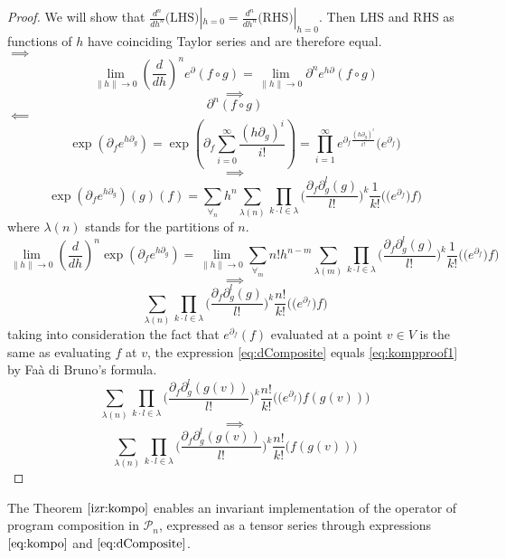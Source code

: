 \documentclass{article}
\newcommand{\dP}{\mathcal{P}}
\newcommand{\D}{\partial}
\begin{document}
\begin{proof}
  We will show that $\frac{d^n}{dh^n}\text{(LHS)}|_{h=0}=\frac{d^n}{dh^n}\text{(RHS)}|_{h=0}$. Then $\text{LHS}$ and $\text{RHS}$ as functions
  of $h$ have coinciding Taylor series and are therefore equal.\\
 $\implies$
 $$\lim\limits_{\lVert h\rVert\to 0}(\frac{d}{dh})^ne^\D(f\circ g)=\lim\limits_{\lVert h\rVert\to 0}\D^ne^{h\D}(f\circ g)$$
 $$\implies$$
 \begin{equation}\label{eq:kompproof1}
 \D^n(f\circ g)
 \end{equation}
 $\impliedby$
 $$\exp(\D_fe^{h\D_g})=\exp\left(\D_f\sum\limits_{i=0}^{\infty}\frac{(h\D_g)^i}{i!}\right)=\prod_{i=1}^{\infty}e^{\D_f\frac{(h\D_g)^i}{i!}}\Big(e^{\D_f}\Big)$$
 $$\implies$$
 $$\exp(\D_fe^{h\D_g})(g)(f)=\sum\limits_{\forall_n}h^n\sum\limits_{\lambda(n)}\prod\limits_{k\cdot l\in\lambda}\Big(\frac{\D_f\D_g^l(g)}{l!}\Big)^k\frac{1}{k!}\Big(\Big(e^{\D_f}\Big)f\Big)$$
 where $\lambda(n)$ stands for the partitions of $n$.
 $$\lim\limits_{\lVert h\rVert\to 0}(\frac{d}{dh})^n\exp(\D_fe^{h\D_g})=\lim\limits_{\lVert h\rVert\to 0}\sum\limits_{\forall_m}n!h^{n-m}\sum\limits_{\lambda(m)}\prod\limits_{k\cdot l\in\lambda}\Big(\frac{\D_f\D_g^l(g)}{l!}\Big)^k\frac{1}{k!}\Big(\Big(e^{\D_f}\Big)f\Big)$$
 $$\implies$$
 \begin{equation}\label{eq:dComposite}
 \sum\limits_{\lambda(n)}\prod\limits_{k\cdot l\in\lambda}\Big(\frac{\D_f\D_g^l(g)}{l!}\Big)^k\frac{n!}{k!}\Big(\Big(e^{\D_f}\Big)f\Big)
 \end{equation}
 taking into consideration the fact that $e^{\D_f}(f)$ evaluated at a point $v\in V$ is the same as evaluating $f$ at $v$, the expression \eqref{eq:dComposite} equals \eqref{eq:kompproof1} by Faà di Bruno's formula.
   $$\sum\limits_{\lambda(n)}\prod\limits_{k\cdot l\in\lambda}\Big(\frac{\D_f\D_g^l(g(v))}{l!}\Big)^k\frac{n!}{k!}\Big(\Big(e^{\D_f}\Big)f(g(v))\Big)$$
   $$\implies$$
   \begin{equation}\label{eq:dCompositePoint}
   \sum\limits_{\lambda(n)}\prod\limits_{k\cdot l\in\lambda}\Big(\frac{\D_f\D_g^l(g(v))}{l!}\Big)^k\frac{n!}{k!}\Big(f(g(v))\Big)
   \end{equation}
 \end{proof}       
 The Theorem $\ref{izr:kompo}$ enables an invariant implementation of the operator of program composition in $\dP_n$, expressed as a tensor series through expressions $\eqref{eq:kompo}$ and $\eqref{eq:dComposite}$. 
 
\end{document}
